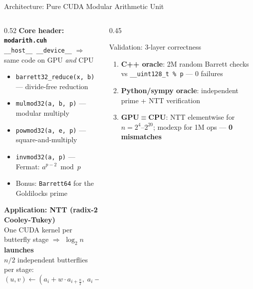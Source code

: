 \documentclass[aspectratio=169,10pt]{beamer}
\begin{document}
\begin{frame}{Architecture: Pure CUDA Modular Arithmetic Unit}

\begin{columns}
\begin{column}{0.52\textwidth}
  \textbf{Core header: \texttt{modarith.cuh}}\\
  \texttt{\_\_host\_\_ \_\_device\_\_} $\Rightarrow$ same code on GPU \emph{and} CPU\\[0.4em]

  \begin{itemize}
    \item \texttt{barrett32\_reduce(x, b)} — divide-free reduction
    \item \texttt{mulmod32(a, b, p)} — modular multiply
    \item \texttt{powmod32(a, e, p)} — square-and-multiply
    \item \texttt{invmod32(a, p)} — Fermat: $a^{p-2} \bmod p$
    \item Bonus: \texttt{Barrett64} for the Goldilocks prime
  \end{itemize}

  \vspace{0.6em}
  \textbf{Application: NTT (radix-2 Cooley-Tukey)}\\
  One CUDA kernel per butterfly stage $\Rightarrow$ \textbf{$\log_2 n$ launches}\\
  $n/2$ independent butterflies per stage:
  \[
    (u, v) \leftarrow (a_i + w \cdot a_{i+\frac{n}{2}},\; a_i - w \cdot a_{i+\frac{n}{2}}) \bmod p
  \]
\end{column}
\begin{column}{0.45\textwidth}
  \begin{block}{Validation: 3-layer correctness}
    \begin{enumerate}
      \item \textbf{C++ oracle}: 2M random Barrett checks vs \texttt{\_\_uint128\_t \% p} — 0 failures
      \item \textbf{Python/sympy oracle}: independent prime + NTT verification
      \item \textbf{GPU$\equiv$CPU}: NTT elementwise for $n{=}2^4$--$2^{20}$; modexp for 1M ops — \textbf{0 mismatches}
    \end{enumerate}
  \end{block}
\end{column}
\end{columns}
\end{frame}
\end{document}
